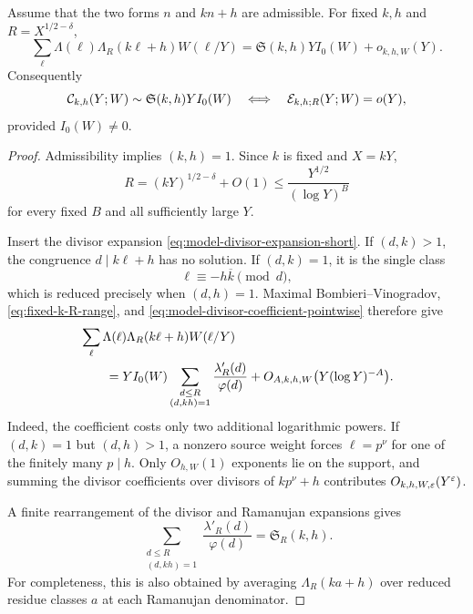 \begin{proposition}
\label{prop:fixed-k-boundary}
Assume that the two forms $n$ and $kn+h$ are admissible.  For fixed
$k,h$ and $R=X^{1/2-\delta}$,
\begin{equation}
 \sum_\ell\Lambda(\ell)\Lambda_R(k\ell+h)W(\ell/Y)
 =\mathfrak S(k,h)YI_0(W)+o_{k,h,W}(Y).
 \label{eq:fixed-k-model-cross}
\end{equation}
Consequently
\begin{equation}
 \mathcal C_{k,h}(Y;W)\sim\mathfrak S(k,h)YI_0(W)
 \quad\Longleftrightarrow\quad
 \mathcal E_{k,h;R}(Y;W)=o(Y),
 \label{eq:fixed-k-equivalence}
\end{equation}
provided $I_0(W)\ne0$.
\end{proposition}

\begin{proof}
Admissibility implies $(k,h)=1$.  Since $k$ is fixed and $X=kY$,
\begin{equation}
 R=(kY)^{1/2-\delta}+O(1)
 \le\frac{Y^{1/2}}{(\log Y)^B}
 \label{eq:fixed-k-R-range}
\end{equation}
for every fixed $B$ and all sufficiently large $Y$.

Insert the divisor expansion
\eqref{eq:model-divisor-expansion-short}.  If $(d,k)>1$, the congruence
$d\mid k\ell+h$ has no solution.  If $(d,k)=1$, it is the single class
\begin{equation}
 \ell\equiv-h\overline{k}\pmod d,
 \label{eq:fixed-k-residue-class}
\end{equation}
which is reduced precisely when $(d,h)=1$.  Maximal
Bombieri--Vinogradov, \eqref{eq:fixed-k-R-range}, and
\eqref{eq:model-divisor-coefficient-pointwise} therefore give
\begin{align}
 &\sum_\ell\Lambda(\ell)\Lambda_R(k\ell+h)W(\ell/Y)
 \notag\\
 &\qquad={}
 YI_0(W)
 \sum_{\substack{d\le R\\(d,kh)=1}}
 \frac{\lambda'_R(d)}{\varphi(d)}
 +O_{A,k,h,W}\bigl(Y(\log Y)^{-A}\bigr).
 \label{eq:fixed-k-divisor-main}
\end{align}
Indeed, the coefficient costs only two additional logarithmic powers.
If $(d,k)=1$ but $(d,h)>1$, a nonzero source weight forces
$\ell=p^\nu$ for one of the finitely many $p\mid h$.  Only
$O_{h,W}(1)$ exponents lie on the support, and summing the divisor
coefficients over divisors of $kp^\nu+h$ contributes
$O_{k,h,W,\varepsilon}(Y^\varepsilon)$.

A finite rearrangement of the divisor and Ramanujan expansions gives
\begin{equation}
 \sum_{\substack{d\le R\\(d,kh)=1}}
 \frac{\lambda'_R(d)}{\varphi(d)}
 =\mathfrak S_R(k,h).
 \label{eq:fixed-k-finite-rearrangement}
\end{equation}
For completeness, this is also obtained by averaging
$\Lambda_R(ka+h)$ over reduced residue classes $a$ at each Ramanujan
denominator.


\end{proof}
